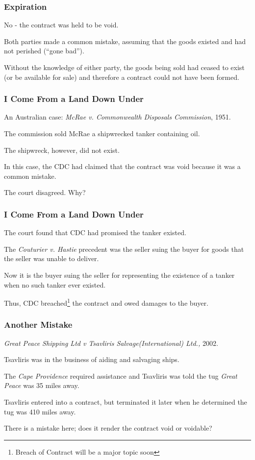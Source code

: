 \begin{frame}
\frametitle{Expiration}

No - the contract was held to be void.

Both parties made a common mistake, assuming that the goods existed and had not perished (``gone bad'').

Without the knowledge of either party, the goods being sold had ceased to exist (or be available for sale) and therefore a contract could not have been formed.

\end{frame}



\begin{frame}
\frametitle{I Come From a Land Down Under}

An Australian case: \textit{McRae v. Commonwealth Disposals Commission}, 1951.

The commission sold McRae a shipwrecked tanker containing oil.

The shipwreck, however, did not exist.

In this case, the CDC had claimed that the contract was void because it was a common mistake.

The court disagreed. Why?

\end{frame}



\begin{frame}
\frametitle{I Come From a Land Down Under}

The court found that CDC had promised the tanker existed. 

The \textit{Couturier v. Hastie} precedent was the seller suing the buyer for goods that the seller was unable to deliver.

Now it is the buyer suing the seller for representing the existence of a tanker when no such tanker ever existed.

Thus, CDC breached\footnote{Breach of Contract will be a major topic soon} the contract and owed damages to the buyer.

\end{frame}



\begin{frame}
\frametitle{Another Mistake}
\textit{Great Peace Shipping Ltd v Tsavliris Salvage(International) Ltd.,} 2002.

Tsavliris was in the business of aiding and salvaging ships.

The \textit{Cape Providence} required assistance and Tsavliris was told the tug \textit{Great Peace} was 35 miles away.

Tsavliris entered into a contract, but terminated it later when he determined the tug was 410 miles away.

There is a mistake here; does it render the contract void or voidable?

\end{frame}



